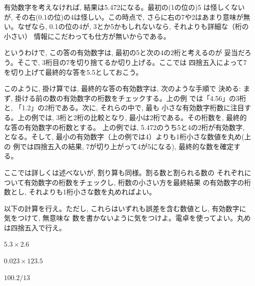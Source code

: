 有効数字を考えなければ, 結果は5.472になる。最初の(1の位の)5
は怪しくないが, その右(0.1の位)の4は怪しい。この時点で, 
さらに右の7や2はあまり意味が無い。なぜなら, 
0.1の位の4が, 3とか5かもしれないなら, それよりも詳細な（桁の小さい）
情報にこだわっても仕方が無いからである。

というわけで, この答の有効数字は, 最初の5と次の4の2桁と考えるのが
妥当だろう。そこで, 3桁目の7を切り捨てるか切り上げる。ここでは
四捨五入によって7を切り上げて最終的な答を5.5としておこう。

このように, 掛け算では, 最終的な答の有効数字は, 次のような手順で
決める: まず, 掛ける前の数の有効数字の桁数をチェックする。上の例
では「4.56」の3桁と, 「1.2」の2桁である。次に, それらの中で, 最も
小さな有効数字桁数に注目する。上の例では, 3桁と2桁の比較となり, 
最小は2桁である。その桁数を, 最終的な答の有効数字の桁数とする。
上の例では, 5.472のうち5と4の2桁が有効数字, となる。そして, 
最小の有効数字（上の例では4）よりも1桁小さな数値を丸め(上の
例では四捨五入の結果, 7が切り上がって4が5になる), 最終的な数を確定する。

ここでは詳しくは述べないが, 割り算も同様。割る数と割られる数の
それぞれについて有効数字の桁数をチェックし, 桁数の小さい方を最終結果
の有効数字の桁数とし, それよりも1桁小さな数を丸めればよい。

\begin{q}\label{q:guard_digit_prac4} 以下の計算を行え。ただし, 
これらはいずれも誤差を含む数値とし, 有効数字に気をつけて, 無意味な
数を書かないように気をつけよ。電卓を使ってよい。丸めは四捨五入で行え。
\begin{edaenumerate}
\item $5.3\times 2.6$
\item $0.023\times 123.5$
\item $100.2 / 13$
\end{edaenumerate}
\end{q}

